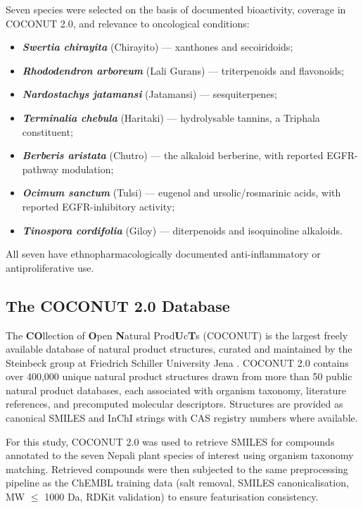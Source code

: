 Seven species were selected on the basis of documented bioactivity, coverage in
COCONUT 2.0, and relevance to oncological conditions:
\begin{itemize}
    \item \textbf{\textit{Swertia chirayita}} (Chirayito) --- xanthones and secoiridoids;
    \item \textbf{\textit{Rhododendron arboreum}} (Lali Gurans) --- triterpenoids and flavonoids;
    \item \textbf{\textit{Nardostachys jatamansi}} (Jatamansi) --- sesquiterpenes;
    \item \textbf{\textit{Terminalia chebula}} (Haritaki) --- hydrolysable tannins, a Triphala constituent;
    \item \textbf{\textit{Berberis aristata}} (Chutro) --- the alkaloid berberine, with reported EGFR-pathway modulation;
    \item \textbf{\textit{Ocimum sanctum}} (Tulsi) --- eugenol and ursolic/rosmarinic acids, with reported EGFR-inhibitory activity;
    \item \textbf{\textit{Tinospora cordifolia}} (Giloy) --- diterpenoids and isoquinoline alkaloids.
\end{itemize}
All seven have ethnopharmacologically documented anti-inflammatory or antiproliferative use.

\subsection{The COCONUT 2.0 Database}

The \textbf{CO}llection of \textbf{O}pen \textbf{N}atural Prod\textbf{U}c\textbf{T}s
(COCONUT) is the largest freely available database of natural product structures,
curated and maintained by the Steinbeck group at Friedrich Schiller University Jena
\parencite{sorokina2021coconut}. COCONUT 2.0 contains over 400,000 unique natural
product structures drawn from more than 50 public natural product databases,
each associated with organism taxonomy, literature references, and precomputed
molecular descriptors. Structures are provided as canonical SMILES and InChI strings
with CAS registry numbers where available.

For this study, COCONUT 2.0 was used to retrieve SMILES for compounds annotated to
the seven Nepali plant species of interest using organism taxonomy matching. Retrieved
compounds were then subjected to the same preprocessing pipeline as the ChEMBL training
data (salt removal, SMILES canonicalisation, MW $\leq$ 1000 Da, RDKit validation) to
ensure featurisation consistency.

